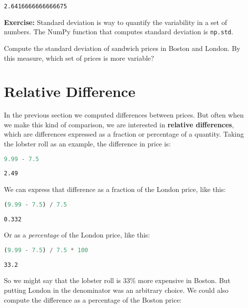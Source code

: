 \documentclass[
]{book}
\newcommand{\passthrough}[1]{#1}
\begin{document}
\begin{lstlisting}
2.6416666666666675
\end{lstlisting}

\textbf{Exercise:} Standard deviation is way to quantify the variability
in a set of numbers. The NumPy function that computes standard deviation
is \passthrough{\lstinline!np.std!}.

Compute the standard deviation of sandwich prices in Boston and London.
By this measure, which set of prices is more variable?

\section{Relative Difference}\label{relative-difference}

In the previous section we computed differences between prices. But
often when we make this kind of comparison, we are interested in
\textbf{relative differences}, which are differences expressed as a
fraction or percentage of a quantity. Taking the lobster roll as an
example, the difference in price is:

\begin{lstlisting}[language=Python]
9.99 - 7.5
\end{lstlisting}

\begin{lstlisting}
2.49
\end{lstlisting}

We can express that difference as a fraction of the London price, like
this:

\begin{lstlisting}[language=Python]
(9.99 - 7.5) / 7.5
\end{lstlisting}

\begin{lstlisting}
0.332
\end{lstlisting}

Or as a \emph{percentage} of the London price, like this:

\begin{lstlisting}[language=Python]
(9.99 - 7.5) / 7.5 * 100
\end{lstlisting}

\begin{lstlisting}
33.2
\end{lstlisting}

So we might say that the lobster roll is 33\% more expensive in Boston.
But putting London in the denominator was an arbitrary choice. We could
also compute the difference as a percentage of the Boston price:
\end{document}
